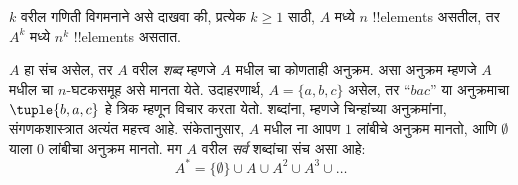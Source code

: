 \documentclass[../../../include/open-logic-section]{subfiles}
\begin{document}
\begin{prob}
$k$ वरील गणिती विगमनाने असे दाखवा की, प्रत्येक $k \ge 1$ साठी,
$A$ मध्ये $n$ !!{element}s असतील, तर $A^k$ मध्ये $n^k$ !!{element}s असतात.
\end{prob}

\begin{ex}
$A$ हा संच असेल, तर $A$ वरील \emph{शब्द} म्हणजे $A$ मधील
चा कोणताही अनुक्रम.
असा अनुक्रम म्हणजे $A$ मधील चा $n$-घटकसमूह असे मानता येते.
उदाहरणार्थ, $A = \{a, b, c\}$ असेल, तर ``$bac$'' या अनुक्रमाचा
$\tuple{b, a, c}$ हे त्रिक म्हणून विचार करता येतो.
शब्दांना, म्हणजे चिन्हांच्या अनुक्रमांना, संगणकशास्त्रात अत्यंत महत्त्व आहे.
संकेतानुसार, $A$ मधील ना आपण $1$ लांबीचे अनुक्रम मानतो,
आणि $\emptyset$ याला $0$ लांबीचा अनुक्रम मानतो.
मग $A$ वरील \emph{सर्व} शब्दांचा संच असा आहे:
\[
A^* = \{\emptyset\} \cup A \cup A^2 \cup A^3 \cup \dots
\]
\end{ex}
\end{document}
